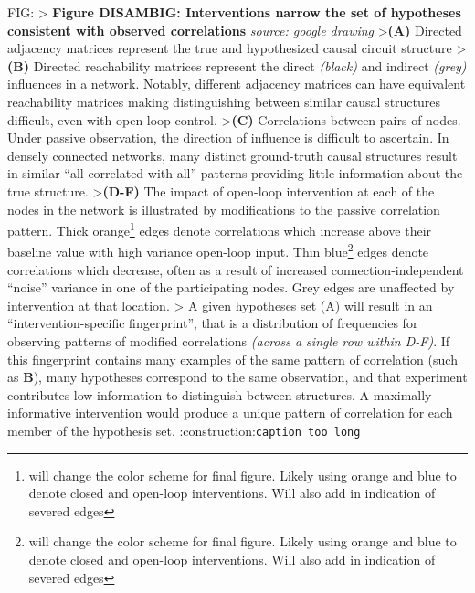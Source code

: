 FIG: %
\textgreater{} \textbf{Figure DISAMBIG: Interventions narrow the set of
hypotheses consistent with observed correlations} \emph{source:
\href{https://docs.google.com/drawings/d/1CBp1MhOW7OGNuBvo7OkIuzqnq8kmN8EEX_AkFuKpVtM/edit}{google
drawing}} \textgreater{}\textbf{(A)} Directed adjacency matrices
represent the true and hypothesized causal circuit structure
\textgreater{}\textbf{(B)} Directed reachability matrices represent the
direct \emph{(black)} and indirect \emph{(grey)} influences in a
network. Notably, different adjacency matrices can have equivalent
reachability matrices making distinguishing between similar causal
structures difficult, even with open-loop control.
\textgreater{}\textbf{(C)} Correlations between pairs of nodes. Under
passive observation, the direction of influence is difficult to
ascertain. In densely connected networks, many distinct ground-truth
causal structures result in similar ``all correlated with all'' patterns
providing little information about the true structure.
\textgreater{}\textbf{(D-F)} The impact of open-loop intervention at
each of the nodes in the network is illustrated by modifications to the
passive correlation pattern. Thick orange\footnote{will change the color
  scheme for final figure. Likely using orange and blue to denote closed
  and open-loop interventions. Will also add in indication of severed
  edges} edges denote correlations which increase above their baseline
value with high variance open-loop input. Thin blue\footnote{will change
  the color scheme for final figure. Likely using orange and blue to
  denote closed and open-loop interventions. Will also add in indication
  of severed edges} edges denote correlations which decrease, often as a
result of increased connection-independent ``noise'' variance in one of
the participating nodes. Grey edges are unaffected by intervention at
that location. \textgreater{} A given hypotheses set (A) will result in
an ``intervention-specific fingerprint'', that is a distribution of
frequencies for observing patterns of modified correlations
\emph{(across a single row within D-F)}. If this fingerprint contains
many examples of the same pattern of correlation (such as \textbf{B}),
many hypotheses correspond to the same observation, and that experiment
contributes low information to distinguish between structures. A
maximally informative intervention would produce a unique pattern of
correlation for each member of the hypothesis set.
:construction:\texttt{caption\ too\ long}

